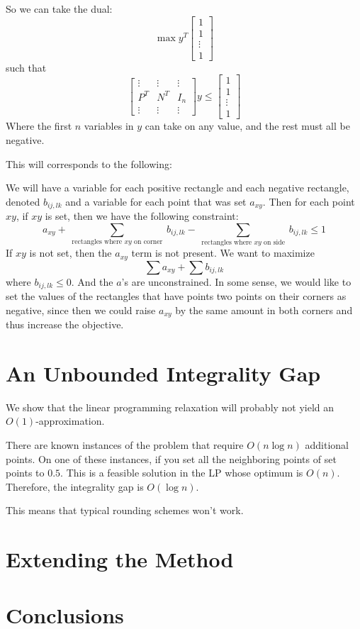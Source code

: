 \documentclass[11pt]{article}
\begin{document}
So we can take the dual:
\[ \max y^T \left[ \begin{array}{c} 1 \\ 1 \\ \vdots \\ 1 \end{array} \right] \]
such that
\[ \left[ \begin{array}{ccc} \vdots & \vdots & \vdots \\
					  P^T & N^T & I_n \\
					\vdots & \vdots & \vdots \end{array} \right] y
\leq  \left[ \begin{array}{c} 1 \\ 1 \\ \vdots \\ 1 \end{array} \right] \]
Where the first $n$ variables in $y$ can take on any value, and the rest must all be negative. 

This will corresponds to the following:

We will have a variable for each positive rectangle and each negative rectangle, denoted $b_{ij, lk}$ and a variable for each point that was set $a_{xy}$. Then for each point $xy$, if $xy$ is set, then we have the following constraint:
\[ a_{xy} + \sum_{\text{ rectangles where $xy$ on corner }} b_{ij, lk} - \sum_{\text{ rectangles where $xy$ on side }} b_{ij,lk} \leq 1 \]
If $xy$ is not set, then the $a_{xy}$ term is not present. We want to maximize
\[ \sum a_{xy} + \sum b_{ij,lk} \]
where $b_{ij,lk} \leq 0$. And the $a$'s are unconstrained. In some sense, we would like to set the values of the rectangles that have points two points on their corners as negative, since then we could raise $a_{xy}$ by the same amount in both corners and thus increase the objective.

\section{An Unbounded Integrality Gap}

We show that the linear programming relaxation will probably not yield an $O(1)$-approximation.

There are known instances of the problem that require $O(n\log n)$ additional points. On one of these instances, if you set all the neighboring points of set points to $0.5$. This is a feasible solution in the LP whose optimum is $O(n)$. Therefore, the integrality gap is $O(\log n)$. 

This means that typical rounding schemes won't work. 

\section{Extending the Method}

\section{Conclusions}
\end{document}
